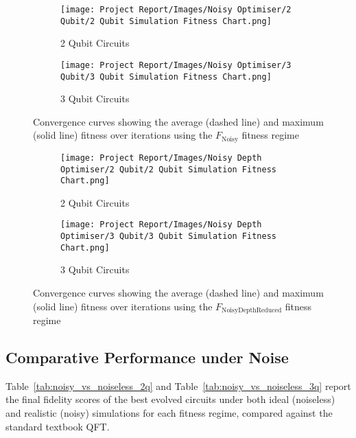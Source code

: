\documentclass[11pt,a4paper]{article}
\begin{document}
\begin{figure}[H]
\centering
\begin{subfigure}{.5\textwidth}
  \centering
  \texttt{[image: Project Report/Images/Noisy Optimiser/2 Qubit/2 Qubit Simulation Fitness Chart.png]}
  \caption{2 Qubit Circuits}
  \label{fig:simple_fitness_2q}
\end{subfigure}%
\begin{subfigure}{.5\textwidth}
  \centering
  \texttt{[image: Project Report/Images/Noisy Optimiser/3 Qubit/3 Qubit Simulation Fitness Chart.png]}
  \caption{3 Qubit Circuits}
  \label{fig:simple_fitness_3q}
\end{subfigure}
\caption{Convergence curves showing the average (dashed line) and maximum (solid line) fitness over iterations using the $F_{\mathrm{Noisy}}$ fitness regime}
\label{fig:simple_fitness_charts}
\end{figure}

\begin{figure}[H]
\centering
\begin{subfigure}{.5\textwidth}
  \centering
  \texttt{[image: Project Report/Images/Noisy Depth Optimiser/2 Qubit/2 Qubit Simulation Fitness Chart.png]}
  \caption{2 Qubit Circuits}
  \label{fig:simple_fitness_2q}
\end{subfigure}%
\begin{subfigure}{.5\textwidth}
  \centering
  \texttt{[image: Project Report/Images/Noisy Depth Optimiser/3 Qubit/3 Qubit Simulation Fitness Chart.png]}
  \caption{3 Qubit Circuits}
  \label{fig:simple_fitness_3q}
\end{subfigure}
\caption{Convergence curves showing the average (dashed line) and maximum (solid line) fitness over iterations using the $F_{\mathrm{NoisyDepthReduced}}$ fitness regime}
\label{fig:simple_fitness_charts}
\end{figure}

\subsection{Comparative Performance under Noise}

Table~\ref{tab:noisy_vs_noiseless_2q} and Table~\ref{tab:noisy_vs_noiseless_3q} report the final fidelity scores of the best evolved circuits under both ideal (noiseless) and realistic (noisy) simulations for each fitness regime, compared against the standard textbook QFT.\newline
\end{document}
